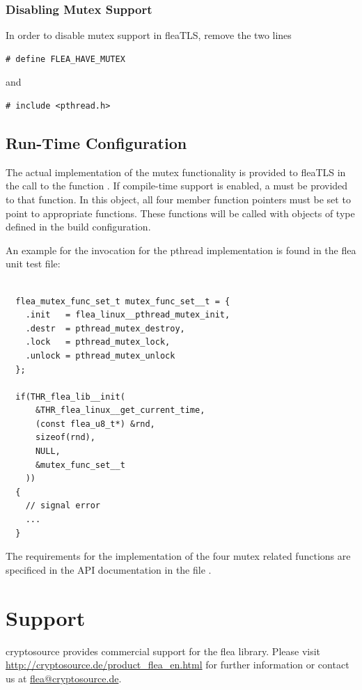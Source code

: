 \documentclass[a4paper,11pt]{scrartcl}
\begin{document}
\subsubsection{Disabling Mutex Support}
In order to disable mutex support in fleaTLS, remove the two lines
\begin{verbatim}
# define FLEA_HAVE_MUTEX
\end{verbatim}
and
\begin{verbatim}
# include <pthread.h>
\end{verbatim}

\subsection{Run-Time Configuration}

The actual implementation of the mutex functionality is provided to fleaTLS in
the call to the function \funcLibInit. If compile-time support is enabled, a
 must be provided to that function. In this object,
all four member function pointers must be set to point to appropriate functions.
These functions will be called with objects of type 
defined in the build configuration.

An example for the invocation \funcLibInit for the pthread implementation is
found in the flea unit test file:
\begin{lstlisting}

  flea_mutex_func_set_t mutex_func_set__t = {
    .init   = flea_linux__pthread_mutex_init,
    .destr  = pthread_mutex_destroy,
    .lock   = pthread_mutex_lock,
    .unlock = pthread_mutex_unlock
  };

  if(THR_flea_lib__init(
      &THR_flea_linux__get_current_time,
      (const flea_u8_t*) &rnd,
      sizeof(rnd),
      NULL,
      &mutex_func_set__t
    ))
  {
    // signal error
    ...
  }
  \end{lstlisting}

  The requirements for the implementation of the four mutex related functions
  are specificed in the API documentation in the file .


  
  \section{Support}
cryptosource provides commercial support for the flea library. Please visit
\url{http://cryptosource.de/product_flea_en.html} for further information or
contact us at \url{flea@cryptosource.de}.
\end{document}
